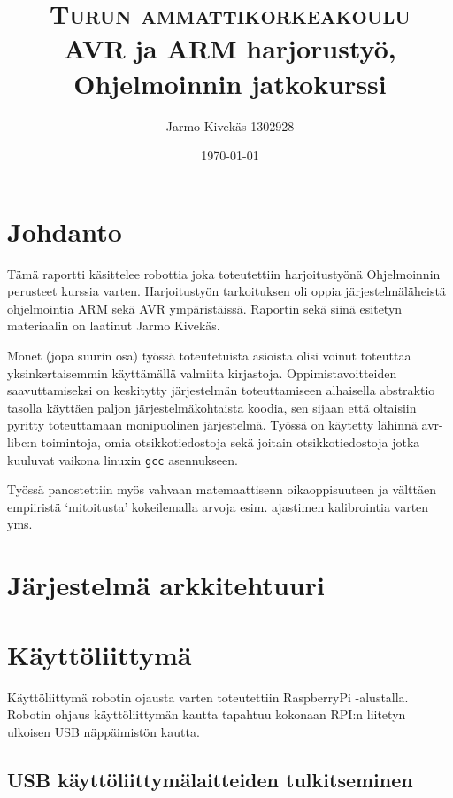 \documentclass[]{article} %
\title{	
\normalfont \normalsize 
\textsc{Turun ammattikorkeakoulu} \\ [25pt] %
\huge AVR ja ARM harjorustyö, Ohjelmoinnin jatkokurssi\\ %
}
\author{
Jarmo Kivekäs 1302928
}
\date{\normalsize\today} %
\numberwithin{equation}{section}
\numberwithin{figure}{section}
\numberwithin{table}{section}
\begin{document}
\maketitle
\tableofcontents

\newpage












\section{Johdanto}
\label{sec:Johdanto}


Tämä raportti käsittelee robottia joka toteutettiin harjoitustyönä Ohjelmoinnin perusteet kurssia varten.
Harjoitustyön tarkoituksen oli oppia järjestelmäläheistä ohjelmointia ARM sekä AVR ympäristäissä.
Raportin sekä siinä esitetyn materiaalin on laatinut Jarmo Kivekäs.

Monet (jopa suurin osa) työssä toteutetuista asioista olisi voinut toteuttaa yksinkertaisemmin käyttämällä valmiita kirjastoja. Oppimistavoitteiden saavuttamiseksi on keskitytty järjestelmän toteuttamiseen alhaisella abstraktio tasolla käyttäen paljon järjestelmäkohtaista koodia, sen sijaan että oltaisiin pyritty toteuttamaan monipuolinen järjestelmä. Työssä on käytetty lähinnä avr-libc:n toimintoja, omia otsikkotiedostoja sekä joitain otsikkotiedostoja jotka kuuluvat vaikona linuxin \verb+gcc+ asennukseen.

Työssä panostettiin myös vahvaan matemaattisenn oikaoppisuuteen ja välttäen empiiristä `mitoitusta' kokeilemalla arvoja esim. ajastimen kalibrointia varten yms.

\section{Järjestelmä arkkitehtuuri}
\label{sec:Jarjestelma arkkitehtuuri}

\section{Käyttöliittymä}
\label{sec:Kayttoliittyma}

Käyttöliittymä robotin ojausta varten toteutettiin RaspberryPi -alustalla.
Robotin ohjaus käyttöliittymän kautta tapahtuu kokonaan RPI:n liitetyn ulkoisen USB näppäimistön kautta.

\subsection{USB käyttöliittymälaitteiden tulkitseminen}
\label{sub:USB kayttoliittymalaitteiden tulkitseminen}
\end{document}
